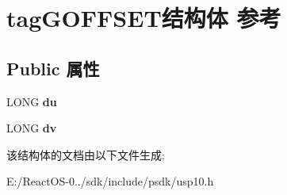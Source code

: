 \hypertarget{structtag_g_o_f_f_s_e_t}{}\section{tag\+G\+O\+F\+F\+S\+E\+T结构体 参考}
\label{structtag_g_o_f_f_s_e_t}
\subsection*{Public 属性}
\begin{DoxyCompactItemize}
\item 
\mbox{\label{structtag_g_o_f_f_s_e_t_ac8465cc9f265f75fc39c4f2584776096}} 
L\+O\+NG {\bfseries du}
\item 
\mbox{\label{structtag_g_o_f_f_s_e_t_a8ead6146106ac3dbcf7217b39f0adeb9}} 
L\+O\+NG {\bfseries dv}
\end{DoxyCompactItemize}


该结构体的文档由以下文件生成\+:\begin{DoxyCompactItemize}
\item 
E\+:/\+React\+O\+S-\/0../sdk/include/psdk/usp10.\+h\end{DoxyCompactItemize}
